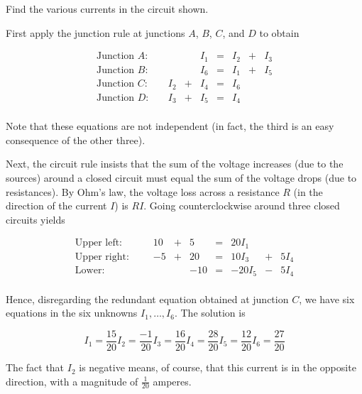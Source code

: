 \documentclass{ximera}
\begin{document}
\begin{example}\label{001817}

Find the various currents in the circuit shown.

\begin{explanation}
%	
  First apply the junction rule at junctions $A$, $B$, $C$, and $D$ to obtain


  \[
  \begin{array}{lccccccc}
	\mbox{Junction } A:\quad & & & I_1 & = & I_2 & + & I_3 \\
	\mbox{Junction } B:\quad & & & I_6 & = & I_1 & + & I_5 \\
	\mbox{Junction } C:\quad & I_2 & + & I_4 & = & I_6 & & \\
	\mbox{Junction } D:\quad & I_3 & + & I_5 & = & I_4 & \\
  \end{array}
  \]

Note that these equations are not independent (in fact, the third is an easy consequence of the other three).

Next, the circuit rule insists that the sum of the voltage increases (due to the sources) around a closed circuit must equal the sum of the voltage drops (due to resistances). By Ohm's law, the voltage loss across a resistance $R$ (in the direction of the current $I$) is $RI$. Going counterclockwise around three closed circuits yields

$$\begin{array}{lcccccccc}
	\mbox{Upper left: } \quad\quad  &10 & + & 5 & = & 20I_1 && \\
	\mbox{Upper right: } &-5 & +& 20 & = & 10I_3& +& 5I_4 \\
	\mbox{Lower: } && &-10 & = & -20I_5 &-& 5I_4 \\
\end{array}$$

Hence, disregarding the redundant equation obtained at junction $C$, we have six equations in the six unknowns $I_1, \dots, I_6$. The solution is

$$	I_1 = \frac{15}{20} I_2 = \frac{-1}{20}I_3 = \frac{16}{20} I_4 = \frac{28}{20}I_5 = \frac{12}{20}I_6 = \frac{27}{20}$$

The fact that $I_2$ is negative means, of course, that this current is in the opposite direction, with a magnitude of $\frac{1}{20}$ amperes.

\end{explanation}

\end{example}
\end{document}
